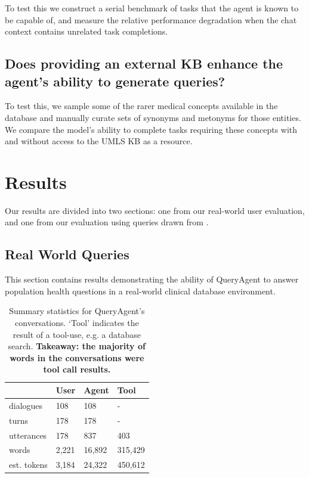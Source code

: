 \documentclass[11pt]{article}
\begin{document}
To test this we construct a serial benchmark of tasks that the agent is known to be capable of, and measure the relative performance degradation when the chat context contains unrelated task completions.

\subsection*{Does providing an external KB enhance the agent's ability to generate queries?}

To test this, we sample some of the rarer medical concepts available in the database and manually curate sets of synonyms and metonyms for those entities.
We compare the model's ability to complete tasks requiring these concepts with and without access to the UMLS KB as a resource.

\section{Results}
Our results are divided into two sections: one from our real-world user evaluation, and one from our evaluation using queries drawn from \citet{ziletti_generating_2025}.

\subsection{Real World Queries}
This section contains results demonstrating the ability of QueryAgent to answer population health questions in a real-world clinical database environment.

\begin{table}[ht]
\centering
\begin{tabular}{|l|l|l|l|}
\hline
	              & User & Agent & Tool \\
\hline
	dialogues	& 108 & 108    & -   \\
	turns       & 178 & 178    & -   \\
    utterances	& 178 & 837    & 403   \\
	words 		& 2,221 & 16,892 & 315,429 \\
	est. tokens	& 3,184 & 24,322 & 450,612\\
\hline
\end{tabular}
\caption{
Summary statistics for QueryAgent's conversations.
`Tool' indicates the result of a tool-use, e.g. a database search.
\textbf{Takeaway: the majority of words in the conversations were tool call results.}
}
\label{tab:conversation-statistics}
\end{table}
\end{document}
